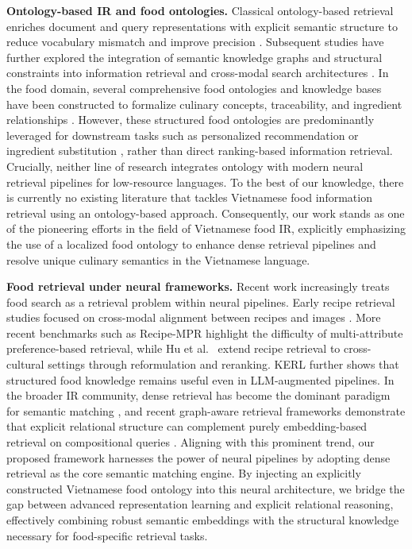 \label{sec:related_work}

\textbf{Ontology-based IR and food ontologies.}
Classical ontology-based retrieval enriches document and query representations with explicit semantic structure to reduce vocabulary mismatch and improve precision \cite{vallet2005ontology, castells2007adaptation, fernandez2011semantic}. Subsequent studies have further explored the integration of semantic knowledge graphs and structural constraints into information retrieval and cross-modal search architectures \cite{chen2021personalized, carvalho2018crossmodal, lien2020recipe}. In the food domain, several comprehensive food ontologies and knowledge bases have been constructed to formalize culinary concepts, traceability, and ingredient relationships \cite{dooley2018foodon, haussmann2019foodkg, recipemind2022}. However, these structured food ontologies are predominantly leveraged for downstream tasks such as personalized recommendation or ingredient substitution \cite{fatemi2023learning}, rather than direct ranking-based information retrieval. Crucially, neither line of research integrates ontology with modern neural retrieval pipelines for low-resource languages. To the best of our knowledge, there is currently no existing literature that tackles Vietnamese food information retrieval using an ontology-based approach. Consequently, our work stands as one of the pioneering efforts in the field of Vietnamese food IR, explicitly emphasizing the use of a localized food ontology to enhance dense retrieval pipelines and resolve unique culinary semantics in the Vietnamese language.

\textbf{Food retrieval under neural frameworks.}
Recent work increasingly treats food search as a retrieval problem within neural pipelines. Early recipe retrieval studies focused on cross-modal alignment between recipes and images \cite{carvalho2018crossmodal, lien2020recipe}. More recent benchmarks such as Recipe-MPR \cite{zhang2023recipempr} highlight the difficulty of multi-attribute preference-based retrieval, while Hu et al.~\cite{hu2024bridging} extend recipe retrieval to cross-cultural settings through reformulation and reranking. KERL \cite{mohbat2025kerl} further shows that structured food knowledge remains useful even in LLM-augmented pipelines. In the broader IR community, dense retrieval has become the dominant paradigm for semantic matching \cite{karpukhin2020dense, thakur2021beir}, and recent graph-aware retrieval frameworks demonstrate that explicit relational structure can complement purely embedding-based retrieval on compositional queries \cite{he2024g, hipporag2024, kg2rag2025}. Aligning with this prominent trend, our proposed framework harnesses the power of neural pipelines by adopting dense retrieval as the core semantic matching engine. By injecting an explicitly constructed Vietnamese food ontology into this neural architecture, we bridge the gap between advanced representation learning and explicit relational reasoning, effectively combining robust semantic embeddings with the structural knowledge necessary for food-specific retrieval tasks.

